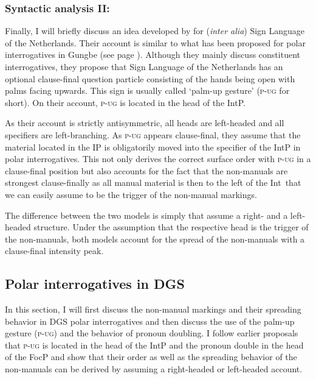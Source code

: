 \subsubsection{Syntactic analysis II: \citet{aboh2010sa}}
Finally, I will briefly discuss an idea developed by \citet{aboh2010sa} for (\textit{inter alia}) Sign Language of the Netherlands. Their account is similar to what has been proposed for polar interrogatives in Gungbe (see page \pageref{ex:gungbepolarinterrogativetree}). Although they mainly discuss constituent interrogatives, they propose that Sign Language of the Netherlands has an optional clause-final question particle consisting of the hands being open with palms facing upwards. This sign is usually called `palm-up gesture' (\textsc{p-ug} for short). On their account, \textsc{p-ug} is located in the head of the IntP.

As their account is strictly antisymmetric, all heads are left-headed and all specifiers are left-branching. As \textsc{p-ug} appears clause-final, they assume that the material located in the IP is obligatorily moved into the specifier of the IntP in polar interrogatives. This not only derives the correct surface order with \textsc{p-ug} in a clause-final position but also accounts for the fact that the non-manuals are strongest clause-finally as all manual material is then to the left of the Int\textdegree\ that we can easily assume to be the trigger of the non-manual markings.

The difference between the two models is simply that \citet{sarac2006interrogative} assume a right- and \citet{aboh2010sa} a left-headed structure. Under the assumption that the respective head is the trigger of the non-manuals, both models account for the spread of the non-manuals with a clause-final intensity peak.

\subsection{Polar interrogatives in DGS}\label{polarinterrogativesdgs}
In this section, I will first discuss the non-manual markings and their spreading behavior in DGS polar interrogatives and then discuss the use of the palm-up gesture (\textsc{p-ug}) and the behavior of pronoun doubling. I follow earlier proposals that \textsc{p-ug} is located in the head of the IntP \citep{aboh2010sa} and the pronoun double in the head of the FocP \citep{de1999phrase} and show that their order as well as the spreading behavior of the non-manuals can be derived by assuming a right-headed or left-headed account.

